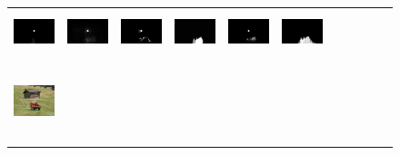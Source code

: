 \documentclass[10pt,twocolumn,letterpaper]{article}
\begin{document}
\begin{figure}
\begin{tabular}{@{}c@{}c@{}c@{}c@{}c@{}c@{}c@{}c@{}c@{}c@{}c}
\includegraphics[width=0.085\linewidth,height=1.25cm]{100_1219_DHS.png} \ &
\includegraphics[width=0.085\linewidth,height=1.25cm]{100_1219_DS.png} \ &
\includegraphics[width=0.085\linewidth,height=1.25cm]{100_1219_LEGS.png} \ &
\includegraphics[width=0.085\linewidth,height=1.25cm]{100_1219_MDF.png} \ &
\includegraphics[width=0.085\linewidth,height=1.25cm]{100_1219_ELD.png} \ &
\includegraphics[width=0.085\linewidth,height=1.25cm]{100_1219_DRFI.png} \ \\
\vspace{-1mm}
\includegraphics[width=0.085\linewidth,height=1.25cm]{b13vehicles_land000.png} \ &

\end{tabular}
\end{figure}
\end{document}
